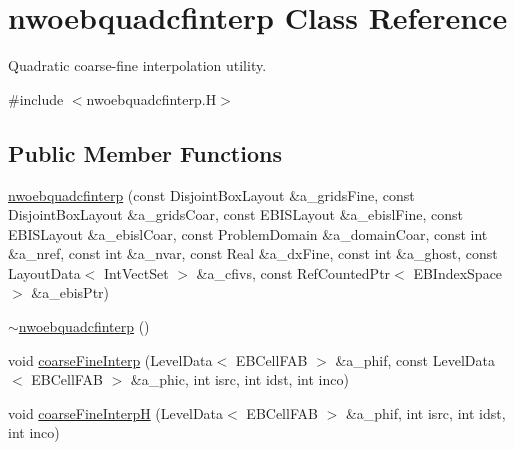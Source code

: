 \hypertarget{classnwoebquadcfinterp}{}\section{nwoebquadcfinterp Class Reference}
\label{classnwoebquadcfinterp}


Quadratic coarse-\/fine interpolation utility.  




{\ttfamily \#include $<$nwoebquadcfinterp.\+H$>$}

\subsection*{Public Member Functions}
\begin{DoxyCompactItemize}
\item 
\hyperlink{classnwoebquadcfinterp_ac5eb63519aa37060c58a858839f864e4}{nwoebquadcfinterp} (const Disjoint\+Box\+Layout \&a\+\_\+grids\+Fine, const Disjoint\+Box\+Layout \&a\+\_\+grids\+Coar, const E\+B\+I\+S\+Layout \&a\+\_\+ebisl\+Fine, const E\+B\+I\+S\+Layout \&a\+\_\+ebisl\+Coar, const Problem\+Domain \&a\+\_\+domain\+Coar, const int \&a\+\_\+nref, const int \&a\+\_\+nvar, const Real \&a\+\_\+dx\+Fine, const int \&a\+\_\+ghost, const Layout\+Data$<$ Int\+Vect\+Set $>$ \&a\+\_\+cfivs, const Ref\+Counted\+Ptr$<$ E\+B\+Index\+Space $>$ \&a\+\_\+ebis\+Ptr)
\item 
\hyperlink{classnwoebquadcfinterp_aebfb5a1081caa673fc4f8f4edbf77520}{$\sim$nwoebquadcfinterp} ()
\item 
void \hyperlink{classnwoebquadcfinterp_a0a306934ca707e2169290c1abfca604b}{coarse\+Fine\+Interp} (Level\+Data$<$ E\+B\+Cell\+F\+AB $>$ \&a\+\_\+phif, const Level\+Data$<$ E\+B\+Cell\+F\+AB $>$ \&a\+\_\+phic, int isrc, int idst, int inco)
\item 
void \hyperlink{classnwoebquadcfinterp_abb9e257dd6cd62da78c013bae7f9d7fb}{coarse\+Fine\+InterpH} (Level\+Data$<$ E\+B\+Cell\+F\+AB $>$ \&a\+\_\+phif, int isrc, int idst, int inco)
\end{DoxyCompactItemize}
